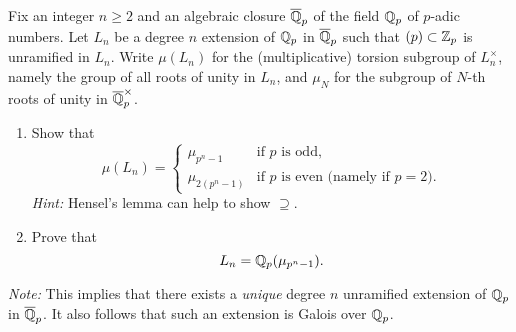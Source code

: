 \documentclass[12pt]{article}  %
\begin{document}
\begin{problem}[3]
    Fix an integer $n \ge 2$ and an algebraic closure $\overline{\mathbb{Q}}_p$ of the field $\mathbb{Q}_p$ of $p$-adic numbers.
    Let $L_n$ be a degree $n$ extension of $\mathbb{Q}_p$ in $\overline{\mathbb{Q}}_p$ such that $(p) \subset \mathbb{Z}_p$ is unramified in $L_n$.
    Write $\mu(L_n)$ for the (multiplicative) torsion subgroup of $L_n^\times$, namely the group of all roots of unity in $L_n$,
    and $\mu_N$ for the subgroup of $N$-th roots of unity in $\overline{\mathbb{Q}}_p^\times$.
    \begin{enumerate}[(1)]
        \item Show that 
        \[
            \mu(L_n) = 
            \begin{cases}
                \mu_{p^n-1} & \text{if $p$ is odd,} \\[4pt]
                \mu_{2(p^n-1)} & \text{if $p$ is even (namely if $p=2$).}
            \end{cases}
        \]
        \emph{Hint:} Hensel's lemma can help to show $\supseteq$.

        \item Prove that 
        \[
            L_n = \mathbb{Q}_p(\mu_{p^n-1}).
        \]
    \end{enumerate}

    \noindent
    \textit{Note:} This implies that there exists a \emph{unique} degree $n$ unramified extension of $\mathbb{Q}_p$ in $\overline{\mathbb{Q}}_p$.
    It also follows that such an extension is Galois over $\mathbb{Q}_p$.
\end{problem}
\end{document}
